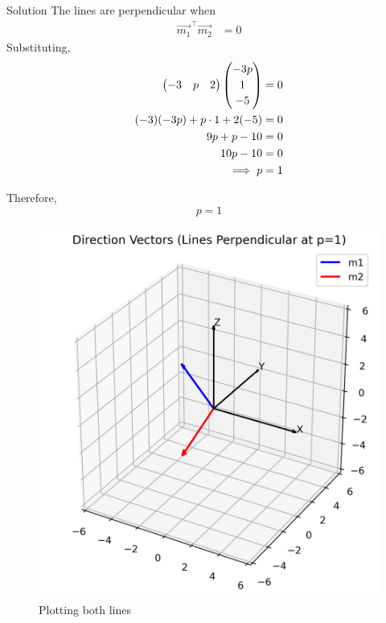 \documentclass{beamer}
\begin{document}
	\begin{frame}{Solution}
		The lines are perpendicular when
		\begin{align}
			\vec{m_1}^\top \vec{m_2} &= 0
		\end{align}
		Substituting,
		\begin{align}
			\begin{pmatrix}-3 & p & 2\end{pmatrix}\begin{pmatrix}-3p\\[2pt] 1\\[2pt] -5\end{pmatrix} &= 0 \\
			(-3)(-3p) + p\cdot 1 + 2(-5) &= 0 \\
			9p + p - 10 &= 0 \\
			10p - 10 &= 0 \\
			\Longrightarrow\; p &= 1
		\end{align}
		
		Therefore,
		\[
		\boxed{p=1}
		\]
	\end{frame}
	\begin{frame}
\begin{figure}[h!]
	\centering
	\includegraphics[width=0.7\linewidth]{figs/equations_solution}
	\caption{Plotting both lines}
	\label{fig:equationssolution}
\end{figure}

	\end{frame}
	
\end{document}
